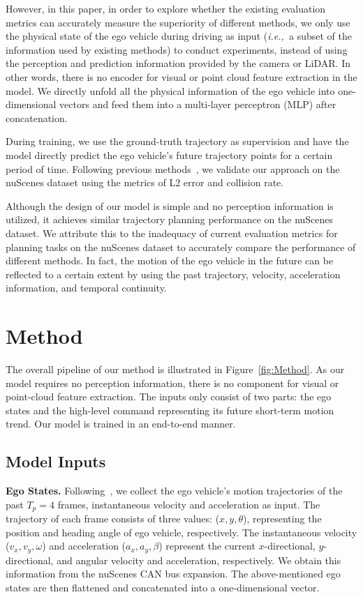 \documentclass[10pt,twocolumn,letterpaper]{article}
\def\ie{\emph{i.e.,~}}
\newcommand{\myPara}[1]{\vspace{.05in}\noindent\textbf{#1.}\quad}
\begin{document}
However, in this paper, in order to explore whether the existing evaluation metrics can accurately measure the superiority of different methods, we only use the physical state of the ego vehicle during driving as input (\ie a subset of the information used by existing methods) to conduct experiments, instead of using the perception and prediction information provided by the camera or LiDAR.
In other words, there is  
no encoder for visual or point cloud feature extraction 
in the model.
We directly unfold all the physical information of the ego vehicle into one-dimensional vectors and feed them into
a multi-layer perceptron (MLP)
after concatenation.


During training, we use the ground-truth trajectory as supervision and have the model directly predict the ego vehicle's future trajectory points for a certain period of time. 
Following previous methods~\cite{hu2022st,hu2022goal}, 
we validate our approach on the nuScenes dataset using the metrics of L2 error and collision rate.



Although the design of our model is simple and no perception information is utilized, 
it achieves similar trajectory planning performance on the nuScenes dataset.
We attribute this to the inadequacy of current evaluation metrics for planning tasks on the nuScenes dataset to accurately compare the performance of different methods.
In fact, the motion of the ego vehicle in the future can be reflected to a certain extent by using the past trajectory, velocity, acceleration information, and temporal continuity. 




\section{Method}
The overall pipeline of our method is illustrated in Figure~\ref{fig:Method}. 
As our model requires no perception information, 
there is no component for 
visual or point-cloud feature extraction. 
The inputs only consist of two parts: the ego states
and the high-level command representing its future short-term motion trend. 
Our model is trained in an end-to-end manner.

\subsection{Model Inputs}
\myPara{Ego States} 
Following~\cite{jiang2023vad}, 
we collect the ego vehicle's motion trajectories of the past $T_p=4$ frames, instantaneous velocity and acceleration as input.
The trajectory of each frame consists of 
three values: ($x,y,\theta$), representing 
the position and heading angle of ego vehicle, respectively. 
The instantaneous velocity ($v_x,v_y,\omega$) 
and acceleration ($a_x,a_y,\beta$) represent
the current $x$-directional, $y$-directional, and angular velocity and acceleration, respectively.
We obtain this information from the nuScenes CAN bus expansion. 
The above-mentioned ego states
are then flattened and concatenated into a 
one-dimensional vector. 
\end{document}

